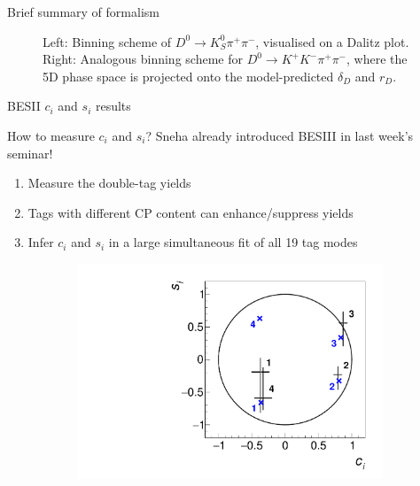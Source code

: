 \documentclass{beamer}
\begin{document}
\begin{frame}{Brief summary of formalism}
\begin{figure}
\begin{subfigure}{0.42\textwidth}
    \end{subfigure}
    \caption{Left: Binning scheme of $D^0\to K_S^0\pi^+\pi^-$, visualised on a Dalitz plot. Right: Analogous binning scheme for $D^0\to K^+K^-\pi^+\pi^-$, where the 5D phase space is projected onto the model-predicted $\delta_D$ and $r_D$.}
  \end{figure}
\end{frame}

\begin{frame}{BESII $c_i$ and $s_i$ results}
  \begin{center}
    \Large{How to measure $c_i$ and $s_i$? Sneha already introduced BESIII in last week's seminar!}
  \end{center}
  \begin{enumerate}
    \setlength\itemsep{0.7em}
    \item{Measure the double-tag yields}
    \item{Tags with different CP content can enhance/suppress yields}
    \item{Infer $c_i$ and $s_i$ in a large simultaneous fit of all 19 tag modes}
  \end{enumerate}
  \begin{figure}
    \centering
    \begin{subfigure}{0.37\textwidth}
      \includegraphics[width = 1.0\textwidth]{Plots/cisi_FitResults_Model.pdf}
    \end{subfigure}%
    \hspace{1cm}
    \begin{subfigure}{0.30\textwidth}

\end{subfigure}
\end{figure}
\end{frame}
\end{document}

